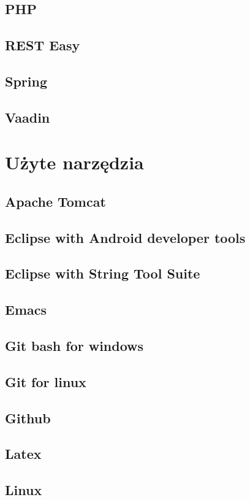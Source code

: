 \documentclass[11pt,a4paper,polish,thesis]{dcsbook}
\begin{document}
\subsection{PHP}
\subsection{REST Easy}
\subsection{Spring}
\subsection{Vaadin}

\section{Użyte narzędzia}
\subsection{Apache Tomcat}
\subsection{Eclipse with Android developer tools}
\subsection{Eclipse with String Tool Suite}
\subsection{Emacs}
\subsection{Git bash for windows}
\subsection{Git for linux}
\subsection{Github}
\subsection{Latex}
\subsection{Linux}
\end{document}
